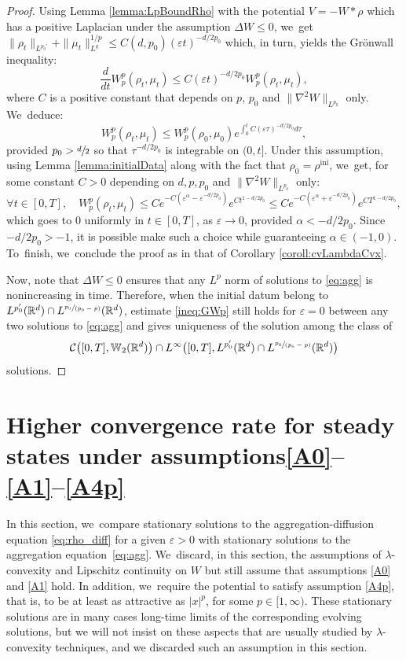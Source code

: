 \documentclass[11pt]{article}
\numberwithin{equation}{section}
\let\line\xspace
\newcommand{\spfrac}[2]{\sfrac{#1}{(#2)}}
\newcommand{\ini}{\mathrm{ini}}
\def\RR{\mathbb{R}}
\def\WW{\mathbb{W}}
\def\eps{\varepsilon}
\def\calC{{\mathcal C}}
\theoremstyle{plain}
\theoremstyle{definition}
\begin{document}
\begin{proof}
Using Lemma \ref{lemma:LpBoundRho} with the potential $V = -W*\rho$ which has a positive Laplacian under the assumption $\Delta W \leq 0$, we~get $\|\rho_t\|_{L^{p_0'}} + \|\mu_t\|_{L^q}^{1/p} \leq C(d,p_0)(\eps t)^{-d/2p_0}$ which, in turn, yields the Grönwall inequality:
\[
\frac{d}{dt} W_p^p(\rho_t, \mu_t) \leq C(\eps t)^{-d/2p_0} W_p^p(\rho_t, \mu_t),
\]
where $C$ is a positive constant that depends on $p$, $p_0$ and $\|\nabla^2 W\|_{L^{p_0}}$ only. We~deduce:
\begin{equation*}%
W_p^p(\rho_t, \mu_t) \leq W_p^p(\rho_0, \mu_0) e^{\int_0^t C(\eps \tau)^{-d/2p_0} d\tau},
\end{equation*}
provided $p_0 > \sfrac d2$ so that $\tau^{-d/2p_0}$ is integrable on $(0,t]$. Under this assumption, using Lemma \ref{lemma:initialData} along with the fact that $\rho_0 = \rho^{\ini}$, we~get, for some constant $C>0$ depending on $d, p, p_0$ and $\|\nabla^2 W\|_{L^{p_0}}$ only:
\[
\forall t \in [0,T], \quad W_p^p(\rho_t, \mu_t) \leq C e^{-C(\eps^{\alpha} - \eps^{-d/2p_0})} e^{Ct^{1-d/2p_0}} \leq C e^{-C(\eps^{\alpha} + \eps^{-d/2p_0})} e^{CT^{1-d/2p_0}},
\]
which goes to 0 uniformly in $t \in [0,T]$, as $\eps \to 0$, provided $\alpha < -d/2p_0$. Since $-d/2p_0 > -1$, it is possible make such a choice while guaranteeing $\alpha \in (-1,0)$. To~finish, we~conclude the proof as in that of Corollary \ref{coroll:cvLambdaCvx}.

Now, note that $\Delta W \leq 0$ ensures that any $L^p$ norm of solutions to \eqref{eq:agg} is nonincreasing in time. Therefore, when the initial datum belong to $L^{p_0'}(\RR^d) \cap L^{\spfrac{p_0}{p_0-p}}(\RR^d)$, estimate \eqref{ineq:GWp} still holds for $\eps=0$ between any two solutions to \eqref{eq:agg} and gives uniqueness of the solution among the class of
\[
\calC\bigl([0,T], \WW_2(\RR^d)\bigr) \cap L^\infty\bigl([0,T], L^{p_0'}(\RR^d) \cap L^{\spfrac{p_0}{p_0-p}}(\RR^d)\bigl)
\]
solutions.
\end{proof}

\section{Higher convergence rate for steady states under assumptions\protect\line \texorpdfstring{\protect\eqref{A0}--\protect\eqref{A1}--\protect\eqref{A4p}}{Ap}}\label{section:stationary}

In this section, we~compare stationary solutions to the aggregation-diffusion equation \eqref{eq:rho_diff} for a given $\eps>0$ with stationary solutions to the aggregation equation~\eqref{eq:agg}. We~discard, in this section, the assumptions of $\lambda$-convexity and Lipschitz continuity on $W$ but still assume that assumptions \eqref{A0} and \eqref{A1} hold. In addition, we~require the potential to satisfy assumption \eqref{A4p}, that is, to be at least as attractive as $|x|^p$, for some $p \in [1, \infty)$.
These stationary solutions are in many cases long-time limits of the corresponding evolving solutions, but we will not insist on these aspects that are usually studied by $\lambda$-convexity techniques, and we discarded such an assumption in this section.
\end{document}
